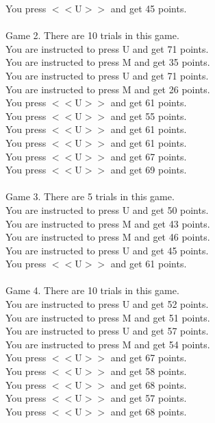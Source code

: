 \documentclass[pdflatex,sn-nature]{sn-jnl}%
\theoremstyle{thmstyleone}%
\theoremstyle{thmstyletwo}%
\theoremstyle{thmstylethree}%
\begin{document}
You press $<<$U$>>$ and get 45 points. $~$\\ 
 $~$\\ 
Game 2. There are 10 trials in this game. $~$\\ 
You are instructed to press U and get 71 points. $~$\\ 
You are instructed to press M and get 35 points. $~$\\ 
You are instructed to press U and get 71 points. $~$\\ 
You are instructed to press M and get 26 points. $~$\\ 
You press $<<$U$>>$ and get 61 points. $~$\\ 
You press $<<$U$>>$ and get 55 points. $~$\\ 
You press $<<$U$>>$ and get 61 points. $~$\\ 
You press $<<$U$>>$ and get 61 points. $~$\\ 
You press $<<$U$>>$ and get 67 points. $~$\\ 
You press $<<$U$>>$ and get 69 points. $~$\\ 
 $~$\\ 
Game 3. There are 5 trials in this game. $~$\\ 
You are instructed to press U and get 50 points. $~$\\ 
You are instructed to press M and get 43 points. $~$\\ 
You are instructed to press M and get 46 points. $~$\\ 
You are instructed to press U and get 45 points. $~$\\ 
You press $<<$U$>>$ and get 61 points. $~$\\ 
 $~$\\ 
Game 4. There are 10 trials in this game. $~$\\ 
You are instructed to press U and get 52 points. $~$\\ 
You are instructed to press M and get 51 points. $~$\\ 
You are instructed to press U and get 57 points. $~$\\ 
You are instructed to press M and get 54 points. $~$\\ 
You press $<<$U$>>$ and get 67 points. $~$\\ 
You press $<<$U$>>$ and get 58 points. $~$\\ 
You press $<<$U$>>$ and get 68 points. $~$\\ 
You press $<<$U$>>$ and get 57 points. $~$\\ 
You press $<<$U$>>$ and get 68 points. $~$\\ 
\end{document}
